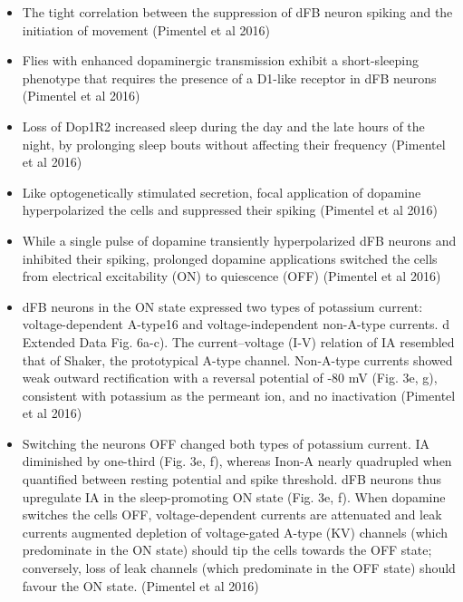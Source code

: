 \documentclass[11pt]{article}
\begin{document}
\begin{itemize}
    \item The tight correlation between the suppression of dFB neuron spiking and the initiation of movement
    \parencite{pimentelOperationHomeostaticSleep2016} (Pimentel et al 2016)

    \item Flies with enhanced dopaminergic transmission exhibit a short-sleeping phenotype that requires the presence of a D1-like  receptor in dFB neurons
    \parencite{pimentelOperationHomeostaticSleep2016} (Pimentel et al 2016)

    \item Loss of Dop1R2 increased sleep during the day and the late hours of the night, by prolonging sleep bouts without affecting their frequency
    \parencite{pimentelOperationHomeostaticSleep2016} (Pimentel et al 2016)

    \item Like optogenetically stimulated secretion, focal application of dopamine hyperpolarized the cells and suppressed their spiking
    \parencite{pimentelOperationHomeostaticSleep2016} (Pimentel et al 2016)

    \item While a single pulse of dopamine transiently hyperpolarized dFB neurons and inhibited their spiking, prolonged dopamine applications switched the cells from electrical excitability (ON) to quiescence (OFF)
    \parencite{pimentelOperationHomeostaticSleep2016} (Pimentel et al 2016)

    \item dFB neurons in the ON state expressed two types of potassium  current: voltage-dependent A-type16 and voltage-independent non-A-type currents. d Extended Data Fig. 6a-c). The current–voltage (I-V) relation of IA resembled that of Shaker, the  prototypical A-type channel.
    Non-A-type currents showed weak outward rectification with a reversal potential of -80 mV (Fig. 3e, g), consistent with potassium as the permeant ion, and no inactivation
    \parencite{pimentelOperationHomeostaticSleep2016} (Pimentel et al 2016)

    \item Switching the neurons OFF changed both types of potassium current. IA diminished by one-third (Fig. 3e, f), whereas Inon-A nearly quadrupled when quantified between resting potential and spike threshold.
    dFB neurons thus upregulate IA in the sleep-promoting ON state (Fig. 3e, f). When dopamine switches the cells OFF, voltage-dependent currents are attenuated and leak currents augmented
    depletion of voltage-gated A-type (KV) channels (which predominate in the ON state) should tip the cells towards the OFF state; conversely, loss of leak channels (which predominate in the OFF state) should favour the ON state.
    \parencite{pimentelOperationHomeostaticSleep2016} (Pimentel et al 2016)


\end{itemize}
\end{document}
